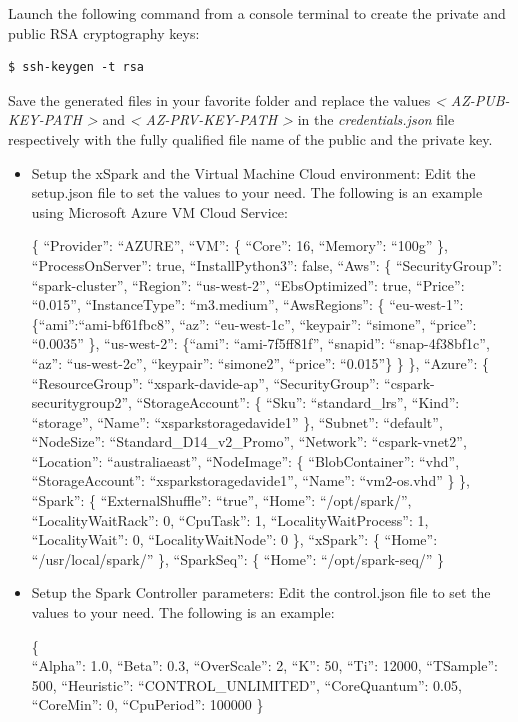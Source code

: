 Launch the following command from a console terminal to create the
private and public RSA cryptography keys:

\begin{verbatim}
$ ssh-keygen -t rsa
\end{verbatim}

Save the generated files in your favorite folder and replace the values
\emph{\textless{} AZ-PUB-KEY-PATH \textgreater{}} and \emph{\textless{}
AZ-PRV-KEY-PATH \textgreater{}} in the \emph{credentials.json} file
respectively with the fully qualified file name of the public and the
private key.

\begin{itemize}
\item
Setup the xSpark and the Virtual Machine Cloud environment: Edit the
setup.json file to set the values to your need. The following is an
example using Microsoft Azure VM Cloud Service:

\{ ``Provider'': ``AZURE'', ``VM'': \{ ``Core'': 16, ``Memory'':
``100g'' \}, ``ProcessOnServer'': true, ``InstallPython3'': false,
``Aws'': \{ ``SecurityGroup'': ``spark-cluster'', ``Region'':
``us-west-2'', ``EbsOptimized'': true, ``Price'': ``0.015'',
``InstanceType'': ``m3.medium'', ``AwsRegions'': \{ ``eu-west-1'':
\{``ami'':``ami-bf61fbc8'', ``az'': ``eu-west-1c'', ``keypair'':
``simone'', ``price'': ``0.0035'' \}, ``us-west-2'': \{``ami'':
``ami-7f5ff81f'', ``snapid'': ``snap-4f38bf1c'', ``az'':
``us-west-2c'', ``keypair'': ``simone2'', ``price'': ``0.015''\} \}
\}, ``Azure'': \{ ``ResourceGroup'': ``xspark-davide-ap'',
``SecurityGroup'': ``cspark-securitygroup2'', ``StorageAccount'': \{
``Sku'': ``standard\_lrs'', ``Kind'': ``storage'', ``Name'':
``xsparkstoragedavide1'' \}, ``Subnet'': ``default'', ``NodeSize'':
``Standard\_D14\_v2\_Promo'', ``Network'': ``cspark-vnet2'',
``Location'': ``australiaeast'', ``NodeImage'': \{ ``BlobContainer'':
``vhd'', ``StorageAccount'': ``xsparkstoragedavide1'', ``Name'':
``vm2-os.vhd'' \} \}, ``Spark'': \{ ``ExternalShuffle'': ``true'',
``Home'': ``/opt/spark/'', ``LocalityWaitRack'': 0, ``CpuTask'': 1,
``LocalityWaitProcess'': 1, ``LocalityWait'': 0, ``LocalityWaitNode'':
0 \}, ``xSpark'': \{ ``Home'': ``/usr/local/spark/'' \}, ``SparkSeq'':
\{ ``Home'': ``/opt/spark-seq/'' \}
\item
Setup the Spark Controller parameters: Edit the control.json file to
set the values to your need. The following is an example:

\{\\
``Alpha'': 1.0, ``Beta'': 0.3, ``OverScale'': 2, ``K'': 50, ``Ti'':
12000, ``TSample'': 500, ``Heuristic'': ``CONTROL\_UNLIMITED'',
``CoreQuantum'': 0.05, ``CoreMin'': 0, ``CpuPeriod'': 100000 \}
\end{itemize}

